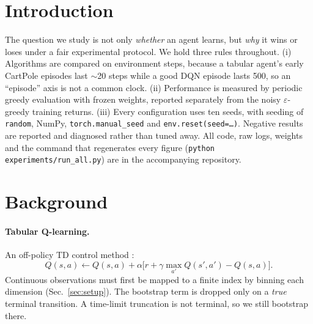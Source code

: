 \begin{abstract}
We compare tabular Q-learning on a discretized state space with a Deep Q-Network (DQN) implemented
from scratch in PyTorch. Every curve is indexed by \emph{cumulative environment steps}, averaged over
ten fixed seeds with 95\% Student-$t$ confidence bands, and evaluated greedily ($\varepsilon=0$, frozen
weights) at regular checkpoints. On CartPole-v1, DQN reaches the solved threshold in
$\approx$7$\times$ fewer environment steps than the best tabular agent, but each step costs
$\approx$23$\times$ more CPU, so tabular learning is $\approx$3$\times$ cheaper per unit of \emph{compute}. On the
sparse-reward MountainCar-v0, DQN with $\varepsilon$-greedy exploration never reaches the goal and
converges to a flat $Q\approx-1/(1-\gamma)$. An optimistically initialized table solves it, while a
pessimistically initialized one fails like DQN, which isolates optimism as the cause. On LunarLander-v3,
ablations show how the target network and the replay buffer each contribute to stability. We close
with an analysis of why neither family scales to continuous control or pixel observations.
\end{abstract}

\section{Introduction}
The question we study is not only \emph{whether} an agent learns, but \emph{why} it wins or loses
under a fair experimental protocol. We hold three rules throughout. (i) Algorithms are compared on
environment steps, because a tabular agent's early CartPole episodes last $\sim$20 steps while a good
DQN episode lasts 500, so an ``episode'' axis is not a common clock. (ii) Performance is measured by
periodic greedy evaluation with frozen weights, reported separately from the noisy $\varepsilon$-greedy
training returns. (iii) Every configuration uses ten seeds, with seeding of
\texttt{random}, NumPy, \texttt{torch.manual\_seed} and \texttt{env.reset(seed=\dots)}. Negative results
are reported and diagnosed rather than tuned away. All code, raw logs, weights and the command that
regenerates every figure (\texttt{python experiments/run\_all.py}) are in the accompanying repository.

\section{Background}
\paragraph{Tabular Q-learning.} An off-policy TD control method \citep[Sec.~6.5]{sutton2018}:
\begin{equation}
Q(s,a)\leftarrow Q(s,a)+\alpha\big[r+\gamma\max_{a'}Q(s',a')-Q(s,a)\big].
\label{eq:q}
\end{equation}
Continuous observations must first be mapped to a finite index by binning each dimension
(Sec.~\ref{sec:setup}). The bootstrap term is dropped only on a \emph{true} terminal transition.
A time-limit truncation is not terminal, so we still bootstrap there.

